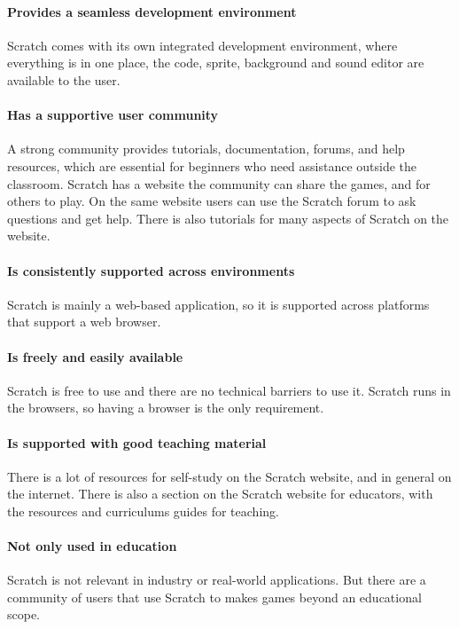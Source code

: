 \paragraph{Provides a seamless development environment}
Scratch comes with its own integrated development environment, where everything is in one place, the code, sprite, background and sound editor are available to the user.

\paragraph{Has a supportive user community}
A strong community provides tutorials, documentation, forums, and help resources, which are essential for beginners who need assistance outside the classroom.
Scratch has a website the community can share the games, and for others to play.
On the same website users can use the Scratch forum to ask questions and get help.
There is also tutorials for many aspects of Scratch on the website.

\paragraph{Is consistently supported across environments}
Scratch is mainly a web-based application, so it is supported across platforms that support a web browser.

\paragraph{Is freely and easily available}
Scratch is free to use and there are no technical barriers to use it.
Scratch runs in the browsers, so having a browser is the only requirement.

\paragraph{Is supported with good teaching material}
There is a lot of resources for self-study on the Scratch website, and in general on the internet.
There is also a section on the Scratch website for educators, with the resources and curriculums guides for teaching.

\paragraph{Not only used in education}
Scratch is not relevant in industry or real-world applications.
But there are a community of users that use Scratch to makes games beyond an educational scope.

